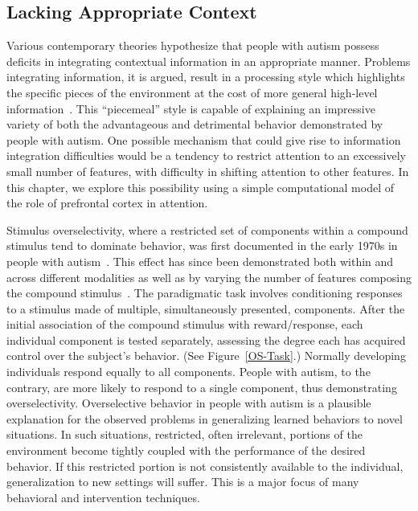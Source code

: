 %
%

\subsection{Lacking Appropriate Context}
Various contemporary theories hypothesize that people with autism possess deficits in integrating contextual information in an appropriate manner.  Problems integrating information, it is argued, result in a processing style which highlights the specific pieces of the environment at the cost of more general high-level information~\cite{HappeF:1999:WCC}. This ``piecemeal'' style is capable of explaining an impressive variety of both the advantageous and detrimental behavior demonstrated by people with autism.  One possible mechanism that could give rise to information integration difficulties would be a tendency to restrict attention to an excessively small number of features, with difficulty in shifting attention to other features.  In this chapter, we explore this possibility using a simple computational model of the role of prefrontal cortex in attention.

Stimulus overselectivity, where a restricted set of components within a compound stimulus tend to dominate behavior, was first documented in the early 1970s in people with autism~\cite{LovaasO:1971:Selective}.  This effect has since been demonstrated both within and across different modalities as well as by varying the number of features composing the compound stimulus~\cite{ReedP:2005:TaskLoad}.  The paradigmatic task involves conditioning responses to a stimulus made of multiple, simultaneously presented, components.  After the initial association of the compound stimulus with reward/response, each individual component is tested separately, assessing the degree each has acquired control over the subject's behavior. (See Figure~\ref{OS-Task}.)  Normally developing individuals respond equally to all components.  People with autism, to the contrary, are more likely to respond to a single component, thus demonstrating overselectivity.  Overselective behavior in people with autism is a plausible explanation for the observed problems in generalizing learned behaviors to novel situations.  In such situations, restricted, often irrelevant, portions of the environment become tightly coupled with the performance of the desired behavior.  If this restricted portion is not consistently available to the individual, generalization to new settings will suffer.  This is a major focus of many behavioral and intervention techniques. 

